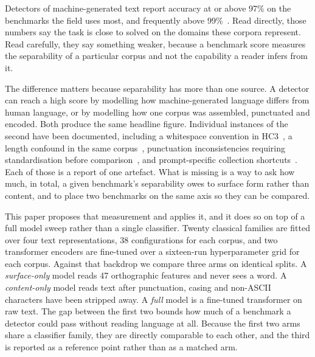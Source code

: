 \documentclass[conference,a4paper]{IEEEtran}
\begin{document}
Detectors of machine-generated text report accuracy at or above 97\% on the benchmarks the field uses most, and frequently above 99\%~\cite{Guo2023close,Su2023plus,Zhou2024exploiting,Ansary2026multirepresentation}. Read directly, those numbers say the task is close to solved on the domains these corpora represent. Read carefully, they say something weaker, because a benchmark score measures the separability of a particular corpus and not the capability a reader infers from it.

The difference matters because separability has more than one source. A detector can reach a high score by modelling how machine-generated language differs from human language, or by modelling how one corpus was assembled, punctuated and encoded. Both produce the same headline figure. Individual instances of the second have been documented, including a whitespace convention in HC3~\cite{Tian2023multiscale}, a length confound in the same corpus~\cite{Baidya2026detecting}, punctuation inconsistencies requiring standardisation before comparison~\cite{Ardeshirifar2025comparing}, and prompt-specific collection shortcuts~\cite{Park2024investigating}. Each of those is a report of one artefact. What is missing is a way to ask how much, in total, a given benchmark's separability owes to surface form rather than content, and to place two benchmarks on the same axis so they can be compared.

This paper proposes that measurement and applies it, and it does so on top of a full model sweep rather than a single classifier. Twenty classical families are fitted over four text representations, 38 configurations for each corpus, and two transformer encoders are fine-tuned over a sixteen-run hyperparameter grid for each corpus. Against that backdrop we compare three arms on identical splits. A \emph{surface-only} model reads 47 orthographic features and never sees a word. A \emph{content-only} model reads text after punctuation, casing and non-ASCII characters have been stripped away. A \emph{full} model is a fine-tuned transformer on raw text. The gap between the first two bounds how much of a benchmark a detector could pass without reading language at all. Because the first two arms share a classifier family, they are directly comparable to each other, and the third is reported as a reference point rather than as a matched arm.
\end{document}
